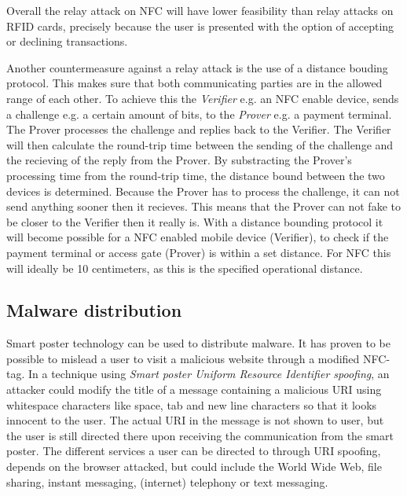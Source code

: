 Overall the relay attack on NFC will have lower feasibility than relay attacks on RFID cards, precisely because the user is presented with the option of accepting or declining transactions.

Another countermeasure against a relay attack is the use of a distance bouding protocol. This makes sure that both communicating parties are in the allowed range of each other. To achieve this the \textit{Verifier} e.g. an NFC enable device, sends a challenge e.g. a certain amount of bits, to the \textit{Prover} e.g. a payment terminal. The Prover processes the challenge and replies back to the Verifier. The Verifier will then calculate the round-trip time between the sending of the challenge and the recieving of the reply from the Prover. By substracting the Prover's processing time from the round-trip time, the distance bound between the two devices is determined. 
Because the Prover has to process the challenge, it can not send anything sooner then it recieves. This means that the Prover can not fake to be closer to the Verifier then it really is.
With a distance bounding protocol it will become possible for a NFC enabled mobile device (Verifier), to check if the payment terminal or access gate (Prover) is within a set distance.
For NFC this will ideally be 10 centimeters, as this is the specified operational distance. \cite{rasmussenrealization,brands1994distance}



\subsection{Malware distribution}
Smart poster technology can be used to distribute malware.
It has proven to be possible to mislead a user to visit a malicious website through a modified NFC-tag.
In a technique using \textit{Smart poster Uniform Resource Identifier spoofing}, an attacker could modify the title of a message containing a malicious URI using whitespace characters like space, tab and new line characters so that it looks innocent to the user.
The actual URI in the message is not shown to user, but the user is still directed there upon receiving the communication from the smart poster.
The different services a user can be directed to through URI spoofing, depends on the browser attacked, but could include the World Wide Web, file sharing, instant messaging, (internet) telephony or text messaging.

